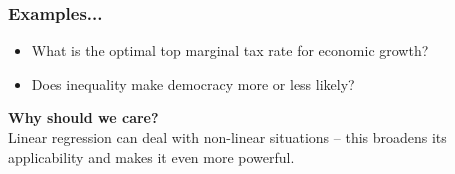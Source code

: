 \documentclass[aspectratio=169]{beamer}
\theoremstyle{principle}
\begin{document}
%
%
%
%
%
%
%

\begin{frame}
\frametitle{Examples...}

\begin{itemize}

\item What is the optimal top marginal tax rate for economic growth?
\bigskip
\bigskip
\bigskip

\item Does inequality make democracy more or less likely?

\end{itemize}

\end{frame}

\begin{frame}

\begin{center}
\Huge\textbf{Why should we care?}\\
\bigskip
\bigskip
\large Linear regression can deal with non-linear situations -- this broadens its applicability and makes it even more powerful.\\
\end{center}

\end{frame}
\end{document}
